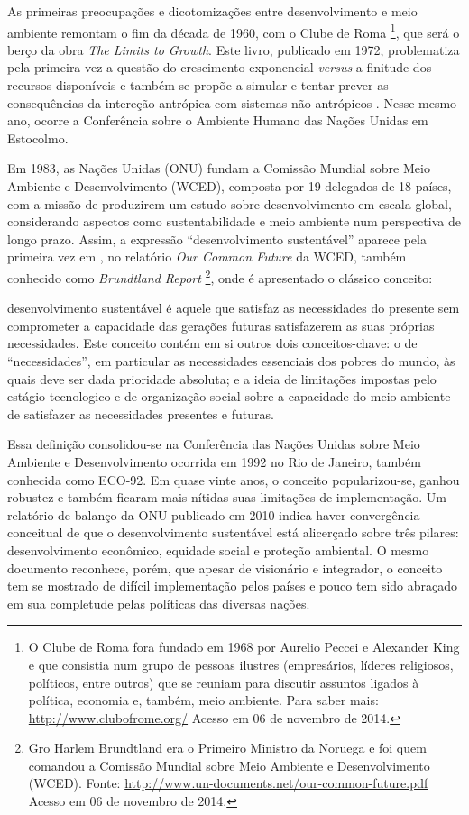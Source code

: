 As primeiras preocupações e dicotomizações entre desenvolvimento e meio ambiente remontam o fim da década de 1960, com o Clube de Roma
\footnote{O Clube de Roma fora fundado em 1968 por Aurelio Peccei e Alexander King e que consistia num grupo de pessoas ilustres (empresários, líderes religiosos, políticos, entre outros) que se reuniam para discutir assuntos ligados à política, economia e, também, meio ambiente. Para saber mais: \url{http://www.clubofrome.org/} Acesso em 06 de novembro de 2014.}, que será o berço da obra \emph{The Limits to Growth}. Este livro, publicado em 1972, problematiza pela primeira vez a questão do crescimento exponencial \emph{versus} a finitude dos recursos disponíveis e também se propõe a simular e tentar prever as consequências da intereção antrópica com sistemas não-antrópicos \cite{MEADOWS1972}. Nesse mesmo ano, ocorre a Conferência sobre o Ambiente Humano das Nações Unidas em Estocolmo.

Em 1983, as Nações Unidas (ONU) fundam a Comissão Mundial sobre Meio Ambiente e Desenvolvimento (WCED), composta por 19 delegados de 18 países, com a missão de produzirem um estudo sobre desenvolvimento em escala global, considerando aspectos como sustentabilidade e meio ambiente num perspectiva de longo prazo. Assim, a expressão ``desenvolvimento sustentável'' aparece pela primeira vez em \citeyear{WCED1987}, no relatório \emph{Our Common Future} da WCED, também conhecido como \emph{Brundtland Report} 
\footnote{Gro Harlem Brundtland era o Primeiro Ministro da Noruega e foi quem comandou a Comissão Mundial sobre Meio Ambiente e Desenvolvimento (WCED). Fonte: \url{http://www.un-documents.net/our-common-future.pdf} Acesso em 06 de novembro de 2014.}, onde é apresentado o clássico conceito:

\begin{citacao}
desenvolvimento sustentável é aquele que satisfaz as necessidades do presente sem comprometer a capacidade das gerações futuras satisfazerem as suas próprias necessidades. Este conceito contém em si outros dois conceitos-chave: o de ``necessidades'', em particular as necessidades essenciais dos pobres do mundo, às quais deve ser dada prioridade absoluta; e a ideia de limitações impostas pelo estágio tecnologico e de organização social sobre a capacidade do meio ambiente de satisfazer as necessidades presentes e futuras. 
\cite[p.41]{WCED1987}
\end{citacao}   

Essa definição consolidou-se na Conferência das Nações Unidas sobre Meio Ambiente e Desenvolvimento ocorrida em 1992 no Rio de Janeiro, também conhecida como ECO-92. Em quase vinte anos, o conceito popularizou-se, ganhou robustez e também ficaram mais nítidas suas limitações de implementação. Um relatório de balanço da ONU publicado em 2010 \cite{ONU2010} indica haver convergência conceitual de que o desenvolvimento sustentável está alicerçado sobre três pilares: desenvolvimento econômico, equidade social e proteção ambiental. O mesmo documento reconhece, porém, que apesar de visionário e integrador, o conceito tem se mostrado de difícil implementação pelos países e pouco tem sido abraçado em sua completude pelas políticas das diversas nações. 

